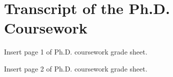 \chapter{Transcript of the Ph.D. Coursework} \label{appendix:transcript}

    Insert page 1 of Ph.D. coursework grade sheet.
    
    \newpage
    Insert page 2 of Ph.D. coursework grade sheet.